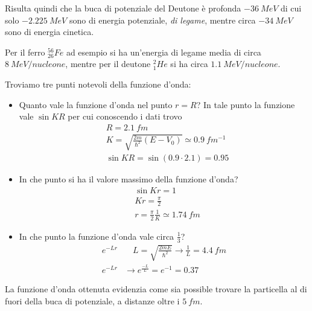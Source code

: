 Risulta quindi che la buca di potenziale del Deutone è profonda $\SI{-36}{MeV}$ di cui solo $\SI{-2.225}{MeV}$ sono di energia potenziale, \emph{di legame}, mentre circa $\SI{-34}{MeV}$ sono di energia cinetica.

Per il ferro $^{56}_{26}Fe$ ad esempio si ha un'energia di legame media di circa $\SI{8}{MeV / nucleone}$, mentre
per il deutone $^{2}_{1}He$ si ha circa $\SI{1.1}{MeV / nucleone}$.

Troviamo tre punti notevoli della funzione d'onda:

\begin{itemize}
\item Quanto vale la funzione d'onda nel punto $r=R$?
In tale punto la funzione vale $\sin K R$ per cui conoscendo i dati trovo
\begin{equation}
\begin{split}
& R = \SI{2.1}{fm} \\
& K = \sqrt{ \frac{2m}{\hbar^2} (E - V_0) } \simeq \SI{0.9}{fm^{-1}} \\
& \sin K R = \sin (0.9 \cdot 2.1) = 0.95
\end{split}
\end{equation}

\item In che punto si ha il valore massimo della funzione d'onda?
\begin{equation}
\begin{split}
& \sin K r = 1 \\
& K r = \frac{\pi}{2} \\
& r = \frac{\pi}{2} \frac{1}{K} \simeq \SI{1.74}{fm}
\end{split}
\end{equation}

\item In che punto la funzione d'onda vale circa $\frac{1}{3}$?
\begin{equation}
\begin{split}
e^{ - L r } & \quad L = \sqrt{\frac{2mE}{\hbar^2}} \to \frac{1}{L} = \SI{4.4}{fm} \\
e^{ - L r } & \rightarrow e^{ \frac{-L}{L}} = e^{ -1 } = 0.37
\end{split}
\end{equation}
\end{itemize}
La funzione d'onda ottenuta evidenzia come sia possible trovare la particella al di fuori della buca di potenziale, a distanze oltre i $\SI{5}{fm}$.









